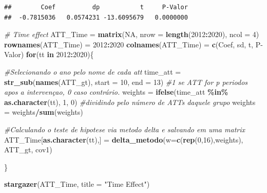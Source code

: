 \documentclass[
]{article}
\newenvironment{Shaded}{\begin{snugshade}}{\end{snugshade}}
\newcommand{\AttributeTok}[1]{\textcolor[rgb]{0.13,0.29,0.53}{#1}}
\newcommand{\CommentTok}[1]{\textcolor[rgb]{0.56,0.35,0.01}{\textit{#1}}}
\newcommand{\ConstantTok}[1]{\textcolor[rgb]{0.56,0.35,0.01}{#1}}
\newcommand{\ControlFlowTok}[1]{\textcolor[rgb]{0.13,0.29,0.53}{\textbf{#1}}}
\newcommand{\DecValTok}[1]{\textcolor[rgb]{0.00,0.00,0.81}{#1}}
\newcommand{\FunctionTok}[1]{\textcolor[rgb]{0.13,0.29,0.53}{\textbf{#1}}}
\newcommand{\NormalTok}[1]{#1}
\newcommand{\OtherTok}[1]{\textcolor[rgb]{0.56,0.35,0.01}{#1}}
\newcommand{\SpecialCharTok}[1]{\textcolor[rgb]{0.81,0.36,0.00}{\textbf{#1}}}
\newcommand{\StringTok}[1]{\textcolor[rgb]{0.31,0.60,0.02}{#1}}
\begin{document}
\begin{verbatim}
##        Coef          dp           t     P-Valor 
##  -0.7815036   0.0574231 -13.6095679   0.0000000
\end{verbatim}

\begin{Shaded}
\begin{Highlighting}[]
\CommentTok{\# Time effect}
\NormalTok{ATT\_Time }\OtherTok{=} \FunctionTok{matrix}\NormalTok{(}\ConstantTok{NA}\NormalTok{, }\AttributeTok{nrow =} \FunctionTok{length}\NormalTok{(}\DecValTok{2012}\SpecialCharTok{:}\DecValTok{2020}\NormalTok{), }\AttributeTok{ncol =} \DecValTok{4}\NormalTok{)}
\FunctionTok{rownames}\NormalTok{(ATT\_Time) }\OtherTok{=} \DecValTok{2012}\SpecialCharTok{:}\DecValTok{2020}
\FunctionTok{colnames}\NormalTok{(ATT\_Time) }\OtherTok{=} \FunctionTok{c}\NormalTok{(}\StringTok{\textquotesingle{}Coef\textquotesingle{}}\NormalTok{, }\StringTok{\textquotesingle{}sd\textquotesingle{}}\NormalTok{, }\StringTok{\textquotesingle{}t\textquotesingle{}}\NormalTok{, }\StringTok{\textquotesingle{}P{-}Valor\textquotesingle{}}\NormalTok{)}
\ControlFlowTok{for}\NormalTok{(tt }\ControlFlowTok{in} \DecValTok{2012}\SpecialCharTok{:}\DecValTok{2020}\NormalTok{)\{}
  
  \CommentTok{\#Selecionando o ano pelo nome de cada att}
\NormalTok{  time\_att }\OtherTok{=} \FunctionTok{str\_sub}\NormalTok{(}\FunctionTok{names}\NormalTok{(ATT\_gt), }\AttributeTok{start =} \DecValTok{10}\NormalTok{, }\AttributeTok{end =} \DecValTok{13}\NormalTok{)}
  \CommentTok{\#1 se ATT for p periodos apos a intervençao, 0 caso contrário.}
\NormalTok{  weights }\OtherTok{=} \FunctionTok{ifelse}\NormalTok{(time\_att }\SpecialCharTok{\%in\%} \FunctionTok{as.character}\NormalTok{(tt), }\DecValTok{1}\NormalTok{, }\DecValTok{0}\NormalTok{)}
  \CommentTok{\#dividindo pelo número de ATTs daquele grupo}
\NormalTok{  weights }\OtherTok{=}\NormalTok{ weights}\SpecialCharTok{/}\FunctionTok{sum}\NormalTok{(weights)}
  
  \CommentTok{\#Calculando o teste de hipotese via metodo delta e salvando em uma matrix}
\NormalTok{  ATT\_Time[}\FunctionTok{as.character}\NormalTok{(tt),] }\OtherTok{=} \FunctionTok{delta\_metodo}\NormalTok{(}\AttributeTok{w=}\FunctionTok{c}\NormalTok{(}\FunctionTok{rep}\NormalTok{(}\DecValTok{0}\NormalTok{,}\DecValTok{16}\NormalTok{),weights), ATT\_gt, cov1)}
  
\NormalTok{\}}

\FunctionTok{stargazer}\NormalTok{(ATT\_Time, }\AttributeTok{title =} \StringTok{"Time Effect"}\NormalTok{)}
\end{Highlighting}
\end{Shaded}
\end{document}
